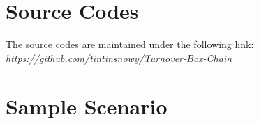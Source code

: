 
\section{Source Codes}
The source codes are maintained under the following link:
\textit{https://github.com/tintinsnowy/Turnover-Box-Chain}

\section{Sample Scenario}
